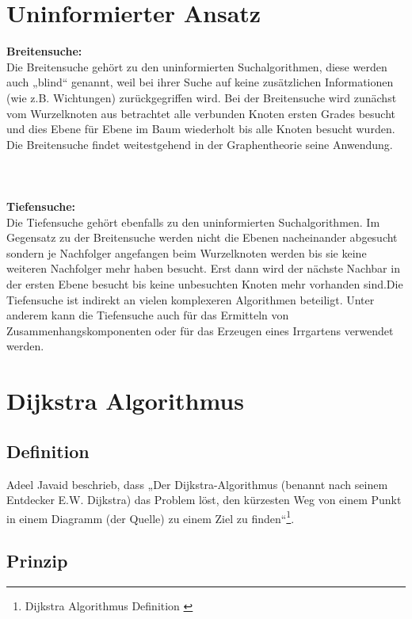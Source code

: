 \section{Uninformierter Ansatz}
\label{Uninformierter Ansatz}
\textbf{Breitensuche:}\\
Die Breitensuche gehört zu den uninformierten Suchalgorithmen, diese werden auch „blind“ genannt, weil bei ihrer 
Suche auf keine zusätzlichen Informationen (wie z.B. Wichtungen) zurückgegriffen wird.
Bei der Breitensuche wird zunächst vom Wurzelknoten aus betrachtet alle verbunden Knoten ersten Grades besucht
und dies Ebene für Ebene im Baum wiederholt bis alle Knoten besucht wurden. 
Die Breitensuche findet weitestgehend in der Graphentheorie seine Anwendung.\cite{Russell:10b}
\\
\\
\\
\\
\textbf{Tiefensuche:}\\
Die Tiefensuche gehört ebenfalls zu den uninformierten Suchalgorithmen.
Im Gegensatz zu der Breitensuche werden nicht die Ebenen nacheinander abgesucht sondern je Nachfolger angefangen 
beim Wurzelknoten werden bis sie keine weiteren Nachfolger mehr haben besucht. Erst dann wird der nächste Nachbar 
in der ersten Ebene besucht bis keine unbesuchten Knoten mehr vorhanden sind.Die Tiefensuche ist indirekt an vielen 
komplexeren Algorithmen beteiligt. Unter anderem kann die Tiefensuche auch für das Ermitteln von Zusammenhangskomponenten
oder für das Erzeugen eines Irrgartens verwendet werden.
\cite{Russell:10c}


\section{Dijkstra Algorithmus}
\label{Dijkstra Algorithmus}
\subsection{Definition}

Adeel Javaid beschrieb, dass „Der Dijkstra-Algorithmus (benannt nach seinem Entdecker E.W. Dijkstra) das Problem löst, den kürzesten Weg von einem Punkt in einem Diagramm (der Quelle) zu einem Ziel zu finden“\footnote{Dijkstra Algorithmus Definition \cite{Javaid2019}}.

\subsection{Prinzip}

